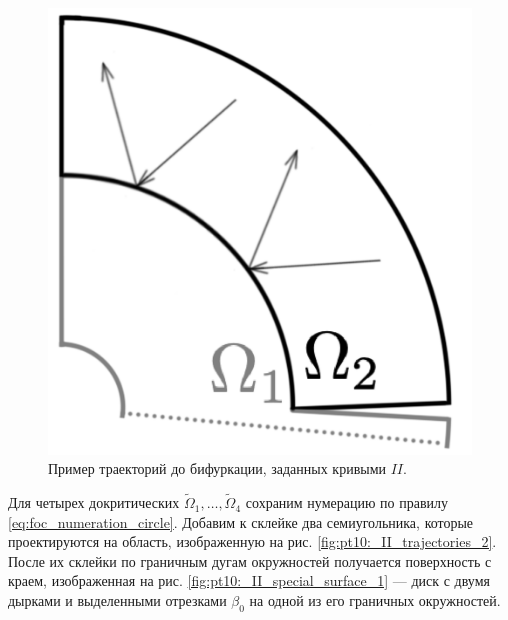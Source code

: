 \begin{figure}[!htb]
\includegraphics[scale=0.1]{images/section3_circular/atoms/II/before/before_trajectories.pdf}
    \caption{Пример траекторий до бифуркации, заданных кривыми $II$.}
    \label{fig:pt10:_II_before_trajectories}
\endminipage\hfill
\end{figure}

Для четырех докритических $\widetilde{\Omega}_1, \ldots, \widetilde{\Omega}_4$ сохраним нумерацию по правилу \eqref{eq:foc_numeration_circle}. Добавим к склейке два семиугольника, которые проектируются на область, изображенную на рис. \ref{fig:pt10:_II_trajectories_2}. После их склейки по граничным дугам окружностей получается поверхность с краем, изображенная на рис. \ref{fig:pt10:_II_special_surface_1} --- диск с двумя дырками и выделенными отрезками $\beta_0$ на одной из его граничных окружностей.

